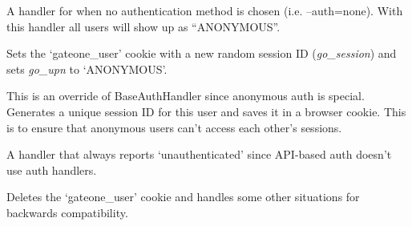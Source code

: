 \documentclass[letterpaper,10pt,openany]{sphinxmanual}
\begin{document}
\begin{fulllineitems}
\label{Developer/authentication:gateone.auth.authentication.NullAuthHandler}
A handler for when no authentication method is chosen (i.e. --auth=none).
With this handler all users will show up as ``ANONYMOUS''.

\begin{fulllineitems}
\label{Developer/authentication:gateone.auth.authentication.NullAuthHandler.get}
Sets the `gateone\_user' cookie with a new random session ID
(\emph{go\_session}) and sets \emph{go\_upn} to `ANONYMOUS'.

\end{fulllineitems}


\begin{fulllineitems}
\label{Developer/authentication:gateone.auth.authentication.NullAuthHandler.user_login}
This is an override of BaseAuthHandler since anonymous auth is special.
Generates a unique session ID for this user and saves it in a browser
cookie.  This is to ensure that anonymous users can't access each
other's sessions.

\end{fulllineitems}


\end{fulllineitems}


\begin{fulllineitems}
\label{Developer/authentication:gateone.auth.authentication.APIAuthHandler}
A handler that always reports `unauthenticated' since API-based auth doesn't
use auth handlers.

\begin{fulllineitems}
\label{Developer/authentication:gateone.auth.authentication.APIAuthHandler.get}
Deletes the `gateone\_user' cookie and handles some other situations for
backwards compatibility.

\end{fulllineitems}


\end{fulllineitems}
\end{document}
